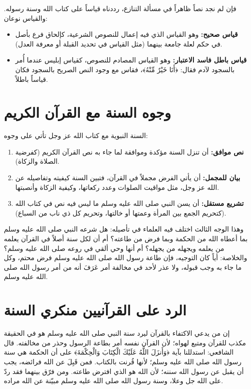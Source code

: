 فإن لم نجد نصاً ظاهراً في مسألة التنازع، رددناه قياساً على كتاب الله وسنة رسوله. والقياس نوعان:
\begin{itemize}
    \item \textbf{قياس صحيح:} وهو القياس الذي فيه إعمال للنصوص الشرعية، كإلحاق فرع بأصل في حكم لعلة جامعة بينهما (مثل القياس في تحديد القبلة أو معرفة العدل).
    \item \textbf{قياس باطل فاسد الاعتبار:} وهو القياس المصادم للنصوص، كقياس إبليس عندما أُمر بالسجود لآدم فقال: ﴿أَنَا خَيْرٌ مِّنْهُ﴾، فقاس مع وجود النص الصريح بالسجود فكان قياساً باطلاً.
\end{itemize}

\section{وجوه السنة مع القرآن الكريم}
السنة النبوية مع كتاب الله عز وجل تأتي على وجوه:
\begin{enumerate}
    \item \textbf{نص موافق:} أن تنزل السنة مؤكدة وموافقة لما جاء به نص القرآن الكريم (كفرضية الصلاة والزكاة).
    \item \textbf{بيان للمجمل:} أن يأتي الفرض مجملاً في القرآن، فتبين السنة كيفيته وتفاصيله عن الله عز وجل، مثل مواقيت الصلوات وعدد ركعاتها، وكيفية الزكاة وأنصبتها.
    \item \textbf{تشريع مستقل:} أن يسن النبي صلى الله عليه وسلم ما ليس فيه نص في كتاب الله (كتحريم الجمع بين المرأة وعمتها أو خالتها، وتحريم كل ذي ناب من السباع).
\end{enumerate}
وهذا الوجه الثالث اختلف فيه العلماء في تأصيله: هل شرعه النبي صلى الله عليه وسلم بما أعطاه الله من الحكمة وبما فرض من طاعته؟ أم أن لكل سنة أصلاً في القرآن يعلمه من يعلمه ويجهله من يجهله؟ أم أنها وحي ألقي في روعه صلى الله عليه وسلم؟ 
والخلاصة: أياً كان التوجيه، فإن طاعة رسول الله صلى الله عليه وسلم فرض محتم، وكل ما جاء به وجب قبوله، ولا عذر لأحد في مخالفة أمر عَرَفَ أنه من أمر رسول الله صلى الله عليه وسلم.

\section{الرد على القرآنيين منكري السنة}
إن من يدعي الاكتفاء بالقرآن ليرد سنة النبي صلى الله عليه وسلم هو في الحقيقة مكذب للقرآن ومتبع لهواه؛ لأن القرآن نفسه أمر بطاعة الرسول وحذر من مخالفته. قال الشافعي: استدللنا بآية ﴿وَأَنزَلَ اللَّهُ عَلَيْكَ الْكِتَابَ وَالْحِكْمَةَ﴾ على أن الحكمة هي سنة رسول الله صلى الله عليه وسلم؛ لأنها قُرنت بالكتاب.
فمن قَبِلَ عن الله فرائضه، يجب أن يقبل عن رسول الله سننه؛ لأن الله هو الذي افترض طاعته. ومن فرّق بينهما فقد ردّ على الله جل وعلا، وسنة رسول الله صلى الله عليه وسلم مبيّنة عن الله مراده.

